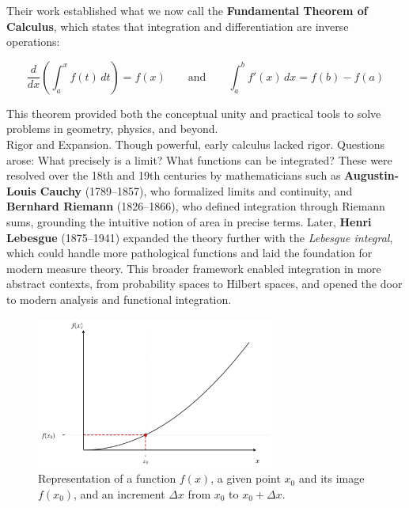 \documentclass{book}
\begin{document}
Their work established what we now call the \textbf{Fundamental Theorem of Calculus}, which states that integration and differentiation are inverse operations:

\[
\frac{d}{dx} \left( \int_a^x f(t)\, dt \right) = f(x)
\qquad \text{and} \qquad
\int_a^b f'(x)\, dx = f(b) - f(a)
\]

This theorem provided both the conceptual unity and practical tools to solve problems in geometry, physics, and beyond.\\

Rigor and Expansion. Though powerful, early calculus lacked rigor. Questions arose: What precisely is a limit? What functions can be integrated? These were resolved over the 18th and 19th centuries by mathematicians such as \textbf{Augustin-Louis Cauchy} (1789--1857), who formalized limits and continuity, and \textbf{Bernhard Riemann} (1826--1866), who defined integration through Riemann sums, grounding the intuitive notion of area in precise terms. Later, \textbf{Henri Lebesgue} (1875--1941) expanded the theory further with the \emph{Lebesgue integral}, which could handle more pathological functions and laid the foundation for modern measure theory. This broader framework enabled integration in more abstract contexts, from probability spaces to Hilbert spaces, and opened the door to modern analysis and functional integration.\\

\begin{figure}[ht]
    \centering
    \includegraphics[width=0.7\textwidth]{figures/appendix/integrals_1.png}
    \caption{Representation of a function $f(x)$, a given point $x_0$ and its image $f(x_0)$, and an increment $\Delta x$ from $x_0$ to $x_0 + \Delta x$.}
    \label{fig:integrals_1}
\end{figure}
\end{document}
